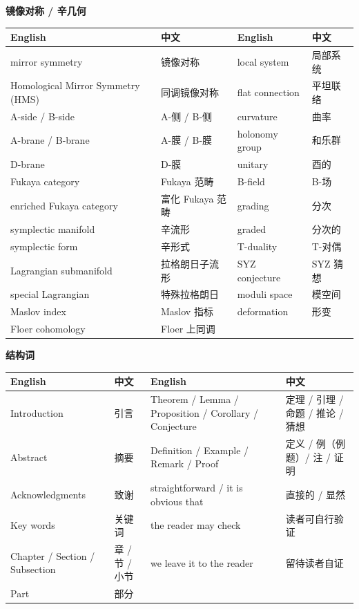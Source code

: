 \vspace{0.8em}
\noindent\textbf{镜像对称 / 辛几何}\par\nobreak
\vspace{0.3em}
{\small
\begin{longtable}{p{}p{}p{}p{}}
\toprule
English & 中文 & English & 中文 \\
\midrule
\endhead
mirror symmetry & 镜像对称 & local system & 局部系统\\
Homological Mirror Symmetry (HMS) & 同调镜像对称 & flat connection & 平坦联络\\
A-side / B-side & A-侧 / B-侧 & curvature & 曲率\\
A-brane / B-brane & A-膜 / B-膜 & holonomy group & 和乐群\\
D-brane & D-膜 & unitary & 酉的\\
Fukaya category & Fukaya 范畴 & B-field & B-场\\
enriched Fukaya category & 富化 Fukaya 范畴 & grading & 分次\\
symplectic manifold & 辛流形 & graded & 分次的\\
symplectic form & 辛形式 & T-duality & T-对偶\\
Lagrangian submanifold & 拉格朗日子流形 & SYZ conjecture & SYZ 猜想\\
special Lagrangian & 特殊拉格朗日 & moduli space & 模空间\\
Maslov index & Maslov 指标 & deformation & 形变\\
Floer cohomology & Floer 上同调 & & \\
\bottomrule
\end{longtable}}

\vspace{0.8em}
\noindent\textbf{结构词}\par\nobreak
\vspace{0.3em}
{\small
\begin{longtable}{p{}p{}p{}p{}}
\toprule
English & 中文 & English & 中文 \\
\midrule
\endhead
Introduction & 引言 & Theorem / Lemma / Proposition / Corollary / Conjecture & 定理 / 引理 / 命题 / 推论 / 猜想\\
Abstract & 摘要 & Definition / Example / Remark / Proof & 定义 / 例（例题）/ 注 / 证明\\
Acknowledgments & 致谢 & straightforward / it is obvious that & 直接的 / 显然\\
Key words & 关键词 & the reader may check & 读者可自行验证\\
Chapter / Section / Subsection & 章 / 节 / 小节 & we leave it to the reader & 留待读者自证\\
Part & 部分 & & \\
\bottomrule
\end{longtable}}

